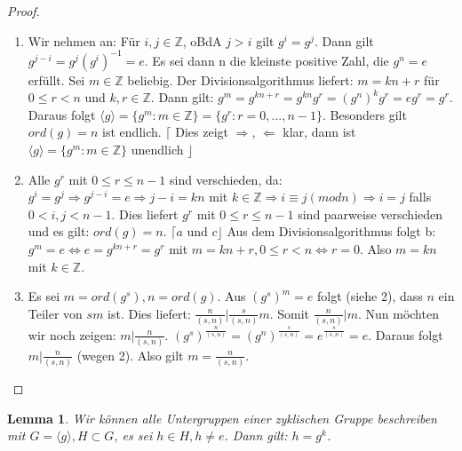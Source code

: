 \documentclass[fleqn, 12pt]{scrartcl}
\newtheorem{lemma}{Lemma}
\theoremstyle{definition}
\theoremstyle{remark}
\begin{document}
\begin{proof}
	\begin{enumerate}
		\item Wir nehmen an: Für $i,j \in \mathbb{Z}$, oBdA $j>i$ gilt $g^{i}=g^{j}$. \newline Dann gilt $g^{j-i}=g^{j}(g^{i})^{-1}=e$. \newline Es sei dann n die kleinste positive Zahl, die $g^{n}=e$ erfüllt. Sei $m \in \mathbb{Z}$ beliebig. Der Divisionsalgorithmus liefert: $m=kn+r$ für $0 \leq r < n$ und $k,r \in \mathbb{Z}$. Dann gilt: \newline $g^{m}=g^{kn+r}=g^{kn}g^{r}=(g^{n})^{k}g^{r}=eg^{r}=g^{r}$. \newline Daraus folgt $\langle g \rangle = \lbrace g^{m} : m \in \mathbb{Z}\rbrace = \lbrace g^{r} : r=0,...,n-1\rbrace$. Besonders gilt $ord(g)=n$ ist endlich. \newline $\lceil$ Dies zeigt $\Rightarrow$, $\Leftarrow$ klar, dann ist $\langle g \rangle = \lbrace g^{m} : m \in \mathbb{Z}\rbrace$ unendlich $\rfloor$
		\item Alle $g^{r}$ mit $0 \leq r \leq n-1$ sind verschieden, da: \newline $g^{i}=g^{j} \Rightarrow g^{j-i}=e \Rightarrow j-i = kn$ mit $k \in \mathbb{Z} \Rightarrow i \equiv j (modn) \Rightarrow i=j$ falls $0<i,j<n-1$. \newline Dies liefert $g^{r}$ mit $0 \leq r \leq n-1$ sind paarweise verschieden und es gilt: \newline $ord(g)=n$. $\lceil a$ und $c\rfloor$ \newline Aus dem Divisionsalgorithmus folgt b: $g^{m}=e \Leftrightarrow e=g^{kn+r}=g^{r}$ mit $m = kn+r, 0 \leq r < n \Leftrightarrow r=0$. Also $m=kn$ mit $k \in \mathbb{Z}$.
		\item Es sei $m=ord(g^{s}), n =ord(g)$. Aus $(g^{s})^{m}=e$ folgt (siehe 2), dass $n$ ein Teiler von $sm$ ist. Dies liefert: $\frac{n}{(s,n)} \vert \frac{s}{(s,n)}m$. Somit $\frac{n}{(s,n)} \vert m$. \newline Nun möchten wir noch zeigen: $m \vert \frac{n}{(s,n)}$. $(g^{s})^{\frac{n}{(s,n)}} = (g^{n})^{\frac{s}{(s,n)}}=e^{\frac{s}{(s,n)}}=e$. Daraus folgt $m \vert \frac{n}{(s,n)}$ (wegen 2). \newline Also gilt $m = \frac{n}{(s,n)}$. 
	\end{enumerate}
\end{proof}

\begin{lemma}
	Wir können alle Untergruppen einer zyklischen Gruppe beschreiben mit $G = \langle g \rangle, H \subset G$, es sei $h \in H, h \neq e$. Dann gilt: $h = g^{k}$.
\end{lemma}
\end{document}

